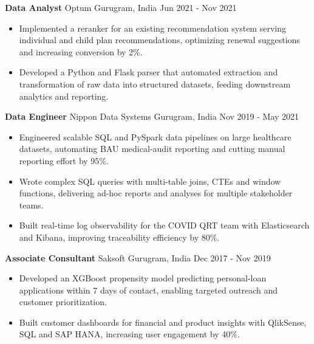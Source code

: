 \documentclass[10pt,a4paper]{article}
\newcommand{\role}[4]{\textbf{#1} \textbar{} #2 \hfill #3 \textbar{} #4\par}
\begin{document}
\vspace{3pt}
\role{Data Analyst}{Optum}{Gurugram, India}{Jun 2021 - Nov 2021}
\begin{itemize}
  \item Implemented a reranker for an existing recommendation system serving individual and child plan recommendations, optimizing renewal suggestions and increasing conversion by 2\%.
  \item Developed a Python and Flask parser that automated extraction and transformation of raw data into structured datasets, feeding downstream analytics and reporting.
\end{itemize}
\vspace{3pt}
\role{Data Engineer}{Nippon Data Systems}{Gurugram, India}{Nov 2019 - May 2021}
\begin{itemize}
  \item Engineered scalable SQL and PySpark data pipelines on large healthcare datasets, automating BAU medical-audit reporting and cutting manual reporting effort by 95\%.
  \item Wrote complex SQL queries with multi-table joins, CTEs and window functions, delivering ad-hoc reports and analyses for multiple stakeholder teams.
  \item Built real-time log observability for the COVID QRT team with Elasticsearch and Kibana, improving traceability efficiency by 80\%.
\end{itemize}
\vspace{3pt}
\role{Associate Consultant}{Saksoft}{Gurugram, India}{Dec 2017 - Nov 2019}
\begin{itemize}
  \item Developed an XGBoost propensity model predicting personal-loan applications within 7 days of contact, enabling targeted outreach and customer prioritization.
  \item Built customer dashboards for financial and product insights with QlikSense, SQL and SAP HANA, increasing user engagement by 40\%.
\end{itemize}
\end{document}
